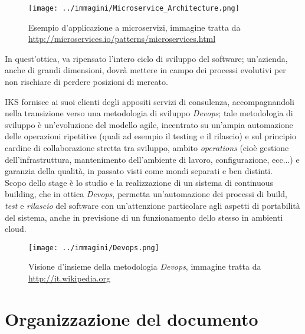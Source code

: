 \begin{figure}[H]
    \capstart
    \captionsetup{justification=centering}
    \centering
    \texttt{[image: ../immagini/Microservice\_Architecture.png]}
    \caption{Esempio d'applicazione a microservizi, immagine tratta da \\ \url{http://microservices.io/patterns/microservices.html}}
\end{figure}

In quest'ottica, va ripensato l'intero ciclo di sviluppo del software; un'azienda, anche di grandi dimensioni, dovrà mettere in campo dei processi evolutivi per non rischiare di perdere posizioni di mercato. 

IKS fornisce ai suoi clienti degli appositi servizi di consulenza, accompagnandoli nella transizione verso una metodologia di sviluppo \textit{Devops}; tale metodologia di sviluppo è un'evoluzione del modello \gls{agile}, incentrato su un'ampia automazione delle operazioni ripetitive (quali ad esempio il testing e il rilascio) e sul principio cardine di collaborazione stretta tra sviluppo, ambito \textit{operations} (cioè gestione dell'infrastruttura, mantenimento dell'ambiente di lavoro, configurazione, ecc...) e garanzia della qualità, in passato visti come mondi separati e ben distinti. \\

Scopo dello stage è lo studio e la realizzazione di un sistema di \gls{continuous building}, che in ottica \textit{Devops}, permetta un'automazione dei processi di \gls{build}, \textit{test} e \textit{rilascio} del software con un'attenzione particolare agli aspetti di portabilità del sistema, anche in previsione di un funzionamento dello stesso in ambienti \gls{cloud}.

\begin{figure}[H]
    \capstart
    \centering
    \texttt{[image: ../immagini/Devops.png]}
    \caption{Visione d'insieme della metodologia \textit{Devops}, immagine tratta da \\ \url{http://it.wikipedia.org}}
\end{figure}

\section{Organizzazione del documento}

